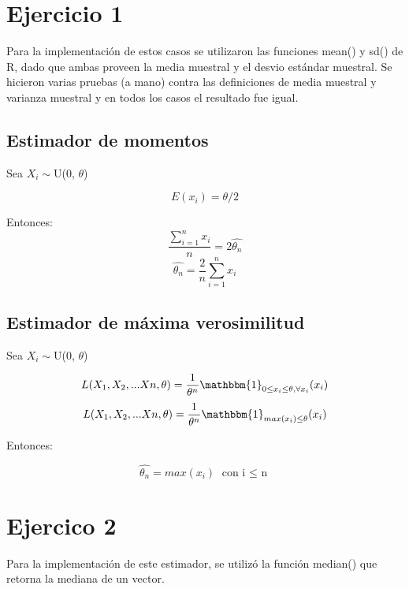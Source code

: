 \documentclass[a4paper]{article}
\begin{document}
\fecha{\today}

\newcommand{\senial}{\textit{se\~nal}}


\maketitle

\section{Ejercicio 1}
Para la implementación de estos casos se utilizaron las funciones mean() y sd() de R, dado que ambas proveen la media muestral y el desvio estándar muestral. Se hicieron varias pruebas (a mano) contra las definiciones de media muestral y varianza muestral y en todos los casos el resultado fue igual. 

\subsection{Estimador de momentos}
Sea $X_{i}\sim$U(0, $\theta$)

\[
E(x_{i}) = \theta / 2
\]

Entonces: 
\[
\frac{\sum_{i=1}^{n}x_{i}}{n} = 2 \hat{\theta_{n}}
\]
\[
\hat{\theta_{n}} = \frac{2}{n} \sum_{i=1}^{n}x_{i}
\]



\subsection{Estimador de máxima verosimilitud}
Sea $X_{i}\sim$U(0, $\theta$)

\[
L(X_{1}, X_{2}, ... X{n}, \theta) = \frac{1}{\theta^{n}} \mathbbm{1}_{0 \leq x_{i} \leq \theta, \forall x_{i}}(x_{i}) 
\]
\[
L(X_{1}, X_{2}, ... X{n}, \theta) = \frac{1}{\theta^{n}} \mathbbm{1}_{max( x_{i}) \leq \theta}(x_{i}) 
\]

Entonces: 

\[
\hat{\theta_{n}} = max(x_{i}) \textrm{ con i $\leq$ n}
\]

\section{Ejercico 2}
Para la implementación de este estimador, se utilizó la función median() que retorna la mediana de un vector.
\end{document}
